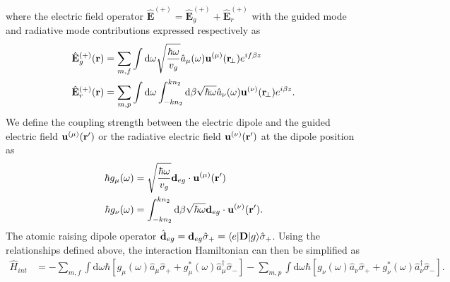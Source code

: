 \documentclass[preprint,aps,pra,onecolumn]{revtex4-1} %
\begin{document}
where the electric field operator $\hat{\mathbf{E}}^{(+)}=\hat{\mathbf{E}}_g^{(+)}+\hat{\mathbf{E}}_{r}^{(+)}$ with  the guided mode and radiative mode contributions expressed respectively as 
\begin{align}
\hat{\mathbf{E}}_g^{(+)}(\mathbf{r}) &= \sum_{m,f} \int \mathrm{d}\omega\sqrt{\frac{\hbar \omega}{v_g}} \hat{a}_\mu (\omega) \mathbf{u}^{(\mu)}(\mathbf{r}\!_\perp) e^{if\beta z}\\
\hat{\mathbf{E}}_r^{(+)}(\mathbf{r}) &= \sum_{m,p} \int \mathrm{d}\omega\int_{-kn_2}^{kn_2}\mathrm{d}\beta \sqrt{\hbar \omega} \hat{a}_\nu (\omega) \mathbf{u}^{(\nu)}(\mathbf{r}\!_\perp) e^{i\beta z}.
\end{align}
We define the coupling strength between the electric dipole and the guided electric field $\mathbf{u}^{(\mu)}(\mathbf{r}')$ or the radiative electric field $ \mathbf{u}^{(\nu)}(\mathbf{r}') $ at the dipole position as
\begin{align}
\hbar g_\mu(\omega) &= \sqrt{\frac{\hbar \omega}{v_g}} \mathbf{d}_{eg}\cdot\mathbf{u}^{(\mu)}(\mathbf{r}') \\
\hbar g_\nu(\omega) &= \int_{-kn_2}^{kn_2}\mathrm{d}\beta \sqrt{\hbar \omega} \mathbf{d}_{eg}\cdot\mathbf{u}^{(\nu)}(\mathbf{r}').
\end{align}
The atomic raising dipole operator $\hat{\mathbf{d}}_{eg}=\mathbf{d}_{eg}\hat{\sigma}_+=\langle{e}\rvert\mathbf{D}\lvert{g}\rangle\hat{\sigma}_+$. Using the relationships defined above, the interaction Hamiltonian can then be simplified as
\begin{align}
\hat{H}_{int} &= -\sum_{m,f} \int\mathrm{d}\omega \hbar\left[g_\mu(\omega)\hat{a}_\mu\hat{\sigma}_+ +g_\mu^*(\omega)\hat{a}^\dagger_\mu\hat{\sigma}_- \right]
-\sum_{m,p} \int\mathrm{d}\omega \hbar\left[g_\nu(\omega)\hat{a}_\nu \hat{\sigma}_+ +g_\nu^*(\omega)\hat{a}^\dagger_\nu\hat{\sigma}_- \right]. 
\end{align}
\end{document}
